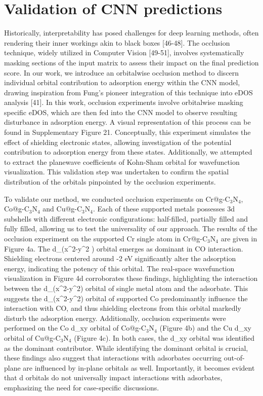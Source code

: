 
\section{Validation of CNN predictions}
Historically, interpretability has posed challenges for deep learning methods, often rendering their inner workings akin to black boxes [46-48].
The occlusion technique, widely utilized in Computer Vision [49-51], involves systematically masking sections of the input matrix to assess their impact on the final prediction score.
In our work, we introduce an orbitalwise occlusion method to discern individual orbital contribution to adsorption energy within the CNN model, drawing inspiration from Fung's pioneer integration of this technique into eDOS analysis [41].
In this work, occlusion experiments involve orbitalwise masking specific eDOS, which are then fed into the CNN model to observe resulting disturbance in adsorption energy.
A visual representation of this process can be found in Supplementary Figure 21. Conceptually, this experiment simulates the effect of shielding electronic states, allowing investigation of the potential contribution to adsorption energy from these states.
Additionally, we attempted to extract the planewave coefficients of Kohn-Sham orbital for wavefunction visualization.
This validation step was undertaken to confirm the spatial distribution of the orbitals pinpointed by the occlusion experiments.

To validate our method, we conducted occlusion experiments on Cr@g-C$_3$N$_4$, Co@g-C$_3$N$_4$ and Cu@g-C$_3$N$_4$.
Each of these supported metals possesses 3d subshells with different electronic configurations: half-filled, partially filled and fully filled, allowing us to test the universality of our approach.
The results of the occlusion experiment on the supported Cr single atom in Cr@g-C$_3$N$_4$ are given in Figure 4a.
The d_(x^2-y^2 ) orbital emerges as dominant in CO interaction.
Shielding electrons centered around -2 eV significantly alter the adsorption energy, indicating the potency of this orbital.
The real-space wavefunction visualization in Figure 4d corroborates these findings, highlighting the interaction between the d_(x^2-y^2) orbital of single metal atom and the adsorbate.
This suggests the d_(x^2-y^2) orbital of supported Co predominantly influence the interaction with CO, and thus shielding electrons from this orbital markedly disturb the adsorption energy.
Additionally, occlusion experiments were performed on the Co d_xy orbital of Co@g-C$_3$N$_4$ (Figure 4b) and the Cu d_xy orbital of Cu@g-C$_3$N$_4$ (Figure 4c).
In both cases, the d_xy orbital was identified as the dominant contributor.
While identifying the dominant orbital is crucial, these findings also suggest that interactions with adsorbates occurring out-of-plane are influenced by in-plane orbitals as well.
Importantly, it becomes evident that d orbitals do not universally impact interactions with adsorbates, emphasizing the need for case-specific discussions.


